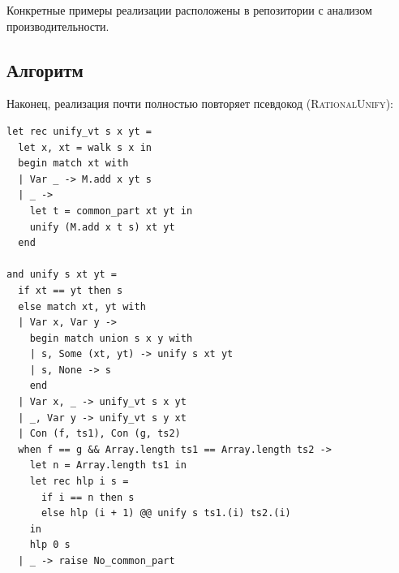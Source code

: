Конкретные примеры реализации расположены в репозитории с анализом производительности.


\subsection{Алгоритм}

Наконец, реализация \unify почти полностью повторяет псевдокод (\textsc{RationalUnify}):
\begin{verbatim}
let rec unify_vt s x yt =
  let x, xt = walk s x in
  begin match xt with
  | Var _ -> M.add x yt s
  | _ ->
    let t = common_part xt yt in
    unify (M.add x t s) xt yt
  end

and unify s xt yt =
  if xt == yt then s
  else match xt, yt with
  | Var x, Var y ->
    begin match union s x y with
    | s, Some (xt, yt) -> unify s xt yt
    | s, None -> s
    end
  | Var x, _ -> unify_vt s x yt
  | _, Var y -> unify_vt s y xt
  | Con (f, ts1), Con (g, ts2)
  when f == g && Array.length ts1 == Array.length ts2 ->
    let n = Array.length ts1 in
    let rec hlp i s =
      if i == n then s
      else hlp (i + 1) @@ unify s ts1.(i) ts2.(i)
    in
    hlp 0 s
  | _ -> raise No_common_part
\end{verbatim}
